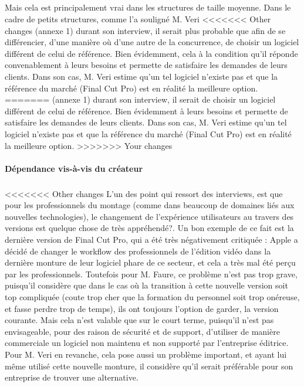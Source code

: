 \begin{itemize}
\subparagraph{}

Mais cela est principalement vrai dans les structures de taille moyenne.
Dans le cadre de petits structures, comme l'a souligné M. Veri
<<<<<<< Other changes
(annexe 1) durant son interview, il serait plus probable que afin de
se différencier, d'une manière où d'une autre de la concurrence, de
choisir un logiciel différent de celui de référence. Bien évidemment,
cela à la condition qu'il réponde convenablement à leurs besoins
et permette de satisfaire les demandes de leurs clients. Dans son cas,
M. Veri estime qu'un tel logiciel n'existe pas et que la référence du
marché (Final Cut Pro) est en réalité la meilleure option.
=======
(annexe 1) durant son interview, il serait %
de choisir un logiciel différent de celui de référence. Bien
évidemment %
à leurs besoins et permette de satisfaire les demandes de leurs
clients. Dans son cas, M. Veri estime qu'un tel logiciel n'existe pas
et que la référence du marché (Final Cut Pro) est en réalité la
meilleure option.
>>>>>>> Your changes

\paragraph{Dépendance vis-à-vis du créateur}

\subparagraph{}

<<<<<<< Other changes
L'un des point qui ressort des interviews, est que pour les professionnels
du montage (comme dans beaucoup de domaines liés aux nouvelles
technologies), le changement de l'expérience utilisateurs au travers
des versions est quelque chose de très appréhendé?. Un bon exemple
de ce fait est la dernière version de Final Cut Pro, qui a été très
négativement critiquée \cite{FinalCutProXReviews} : Apple a décidé
de changer le workflow  des professionnels de l'édition
vidéo dans la dernière monture de leur logiciel phare de ce secteur,
et cela a très mal été perçu par les professionnels. Toutefois pour
M. Faure, ce problème n'est pas trop grave, puisqu'il considère que dans
le cas où la transition à cette nouvelle version soit top compliquée
(coute trop cher que la formation du personnel soit trop onéreuse,
et fasse perdre trop de temps), ils ont toujours l'option de garder,
la version courante.  Mais cela n'est valable que sur le court terme,
puisqu'il n'est pas envisageable, pour des raison de sécurité et de
support, d'utiliser de manière commerciale un logiciel non maintenu
et non supporté par l'entreprise éditrice. Pour M. Veri en revanche,
cela pose aussi un problème important, et ayant lui même utilisé
cette nouvelle monture, il considère qu'il serait préférable pour
son entreprise de trouver une alternative.


\end{itemize}
